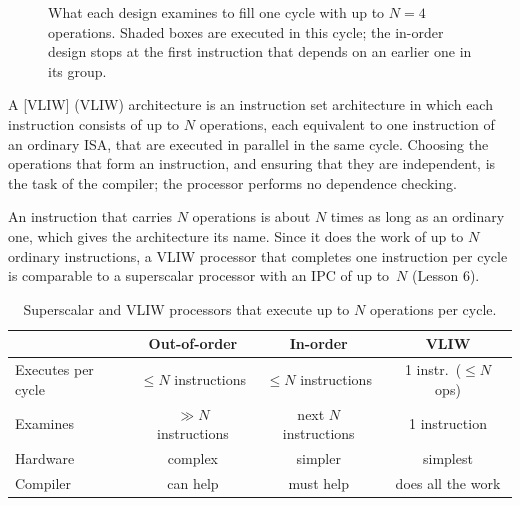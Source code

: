 \documentclass[../main.tex]{subfiles}
\begin{document}
\begin{figure}[htbp]
  \centering
  
  \caption{What each design examines to fill one cycle with up to $N=4$
    operations.  Shaded boxes are executed in this cycle; the in-order design
    stops at the first instruction that depends on an earlier one in its
    group.}
  \label{fig:l11-windows}
\end{figure}

\begin{definition}
  \label{def:l11-vliw}
  A [VLIW]%
   (VLIW) architecture is an
  instruction set architecture in which each instruction consists of up to $N$
  operations, each equivalent to one instruction of an ordinary ISA, that are
  executed in parallel in the same cycle.  Choosing the operations that form
  an instruction, and ensuring that they are independent, is the task of the
  compiler; the processor performs no dependence checking.
\end{definition}

An instruction that carries $N$ operations is about $N$ times as long as an
ordinary one, which gives the architecture its name.  Since it does the work
of up to $N$ ordinary instructions, a VLIW processor that completes one
instruction per cycle is comparable to a superscalar processor with an IPC of
up to~$N$ (Lesson 6).

\begin{table}[htbp]
  \centering\small
  \caption{Superscalar and VLIW processors that execute up to $N$ operations
    per cycle.}
  \label{tab:l11-compare}
  \begin{tabular}{@{}lccc@{}}
    \toprule
                       & Out-of-order          & In-order              & VLIW \\
    \midrule
    Executes per cycle & $\le N$ instructions  & $\le N$ instructions  & 1 instr.\ ($\le N$ ops) \\
    Examines           & $\gg N$ instructions  & next $N$ instructions & 1 instruction \\
    Hardware           & complex               & simpler               & simplest \\
    Compiler           & can help              & must help             & does all the work \\
    \bottomrule
  \end{tabular}
\end{table}
\end{document}
